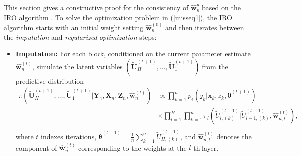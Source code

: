 \documentclass[11pt]{article}
\newcommand{\bX}{{\boldsymbol X}}
\newcommand{\bY}{{\boldsymbol Y}}
\newcommand{\bx}{{\boldsymbol x}}
\newcommand{\bZ}{{\boldsymbol Z}}
\newcommand{\bw}{{\boldsymbol w}}
\newcommand{\bU}{{\boldsymbol U}}
\newcommand{\btheta}{{\boldsymbol \theta}}
\begin{document}
This section gives a constructive proof for the consistency of $\hat{\bw}_n^u$ 
based on the IRO algorithm \citep{liang2018imputation}. 
To solve the optimization problem in (\ref{misseq1}), 
the IRO algorithm starts with an initial weight setting $\hat{\bw}_n^{(0)}$ 
and then iterates between the {\it imputation} and {\it regularized-optimization} steps: 
\begin{itemize}
    \item {\bf Imputation:}  For each block, conditioned on the current parameter estimate $\hat{\bw}_n^{(t)}$, simulate the latent variables  $(\tilde{\bU}_H^{(t+1)},\ldots, \tilde{\bU}_1^{(t+1)})$ 
     from the predictive  distribution 
\begin{equation} \label{decompeq2}
\begin{split} 
 \pi(\tilde{\bU}_H^{(t+1)},\ldots, \tilde{\bU}_1^{(t+1)}|\bY_n,\bX_n,\bZ_n,\hat{\bw}_n^{(t)}) & \propto 
 \prod_{k=1}^n p_{\epsilon}(y_k|\bx_k,z_k,\bar{\btheta}^{(t+1)}) \\  
  & \times \prod_{l=1}^H \prod_{k=1}^n \pi_l(\tilde{U}_{l,(k)}^{(t+1)}| \tilde{U}_{l-1,(k)}^{(t+1)},\hat{\bw}_{n,l}^{(t)}), \\
 \end{split} 
\end{equation}
 where $t$ indexes iterations, $\bar{\btheta}^{(t+1)}=\frac{1}{n} \sum_{k=1}^n \tilde{U}_{H,(k)}^{(t+1)}$, and $\hat{\bw}_{n,l}^{(t)}$ denotes the component of 
 $\hat{\bw}_{n}^{(t)}$ corresponding to the weights at the $l$-th layer. 
 

\end{itemize}
\end{document}
